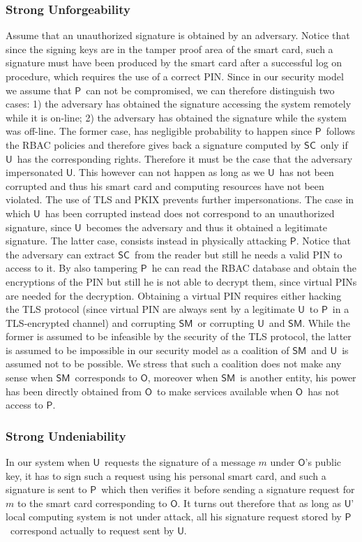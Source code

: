 \documentclass{sig-alternate}
\newcommand{\Owner}{\ensuremath{\mathsf{O}}}
\newcommand{\SM}{\ensuremath{\mathsf{SM}}}
\newcommand{\User}{\ensuremath{\mathsf{U}}}
\newcommand{\Proxy}{\ensuremath{\mathsf{P}}}
\newcommand{\SC}{\ensuremath{\mathsf{SC}}}
\begin{document}
\subsubsection{Strong Unforgeability} Assume that an unauthorized signature is obtained by an adversary. Notice that since the signing keys are in the tamper proof area of the smart card, such a signature must have been produced by the smart card after a successful log on procedure, which requires the use of a correct PIN. Since in our security model we assume that \Proxy\ can not be compromised, we can therefore distinguish two cases: 1) the adversary has obtained the signature accessing the system remotely while it is on-line; 2) the adversary has obtained the signature while the system was off-line.
The former case, has negligible probability to happen since \Proxy\ follows the RBAC policies and therefore gives back a signature computed by \SC\ only if \User\ has the corresponding rights. Therefore it must be the case that the adversary impersonated \User. This however can not happen as long as we \User\ has not been corrupted and thus his smart card and computing resources have not been violated. The use of TLS and PKIX prevents further impersonations. The case in which \User\ has been corrupted instead does not correspond to an unauthorized signature, since \User\ becomes the adversary and thus it obtained a legitimate signature.
The latter case, consists instead in physically attacking \Proxy. Notice that the adversary can extract \SC\ from the reader but still he needs a valid PIN to access to it. By also tampering \Proxy\ he can read the RBAC database and obtain the encryptions of the PIN but still he is not able to decrypt them, since virtual PINs are needed for the decryption. Obtaining a virtual PIN requires either hacking the TLS protocol (since virtual PIN are always sent by a legitimate \User\ to \Proxy\ in a TLS-encrypted channel) and corrupting \SM\ or corrupting \User\ and \SM. While the former is assumed to be infeasible by the security of the TLS protocol, the latter is assumed to be impossible in our security model as a coalition of \SM\ and \User\ is assumed not to be possible. We stress that such a coalition does not make any sense when \SM\ corresponds to \Owner, moreover when \SM\ is another entity, his power has been directly obtained from \Owner\ to make services available when \Owner\ has not
access to \Proxy.

\subsubsection{Strong Undeniability} In our system when \User\ requests the signature of a message $m$ under \Owner's public key, it has to sign such a request using his personal smart card, and such a signature is sent to \Proxy\ which then verifies it before sending a signature request for $m$ to the smart card corresponding to \Owner. It turns out therefore that as long as \User' local computing system is not under attack, all his signature request stored by \Proxy\ correspond actually to request sent by \User.
\end{document}
